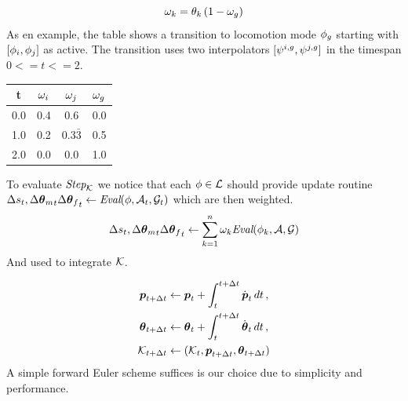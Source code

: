 \begin{equation}
\omega_k = \theta_k \, (1-\omega_g)  
\end{equation}
As en example, the table shows a transition to locomotion mode $\phi_g$ starting with $[\phi_i,\phi_j]$ as active. The transition uses two interpolators $[\psi^{i,g},\psi^{j,g}]$ in the timespan $0<=t<=2$.
\begin{center}
 \begin{tabular}{||c c c c||} 
 \hline
 t & $\omega_i$ & $\omega_j$ & $\omega_g$  \\ [0.5pt] 
 \hline\hline
 0.0 & 0.4 & 0.6 & 0.0 \\ 
 \hline
 1.0 & 0.2 & 0.3$\bar{3}$ & 0.5 \\
 \hline
 2.0  & 0.0 & 0.0 & 1.0 \\
 \hline
\end{tabular}
\end{center}


To evaluate $\textit{Step}_{\mathcal{K}}$ we notice that each $\phi\in\mathcal{L}$ should provide update routine $\Delta{s}_t, {\Delta{ \boldsymbol{\theta } }_m}_t {\Delta{ \boldsymbol{\theta } }_f}_t \leftarrow \textit{Eval}(\phi, \mathcal{A}_t,\mathcal{G}_t)$ which are then weighted.
\begin{subequations}

\begin{align}
\Delta{s}_t, {\Delta{ \boldsymbol{\theta } }_m}_t {\Delta{ \boldsymbol{\theta } }_f}_t &\leftarrow \sum_{k=1}^{n}\omega_k \textit{Eval}(\phi_{k},\mathcal{A},\mathcal{G})\\
\end{align}
\end{subequations}
And used to integrate $\mathcal{K}$.

\begin{subequations}
\begin{align}
    \boldsymbol{p }_{t+\Delta t} &\leftarrow \boldsymbol{p }_t + \int_{t}^{t+\Delta t} \dot{\boldsymbol{p }}_t\,dt \,, \label{eq:time:int:pos}\\
    \boldsymbol{\theta }_{t+\Delta t} &\leftarrow \boldsymbol{\theta }_t + \int_{t}^{t+\Delta t} \dot{\boldsymbol{\theta }}_t\,dt\,, \label{eq:time:int:orientation}\\
    \mathcal{K}_{t+\Delta{t}} &\leftarrow (\mathcal{K}_t, \boldsymbol{p }_{t+\Delta t}, \boldsymbol{\theta }_{t+\Delta t})
\end{align}
\end{subequations}
A simple forward Euler scheme suffices is our choice due to simplicity and performance.

